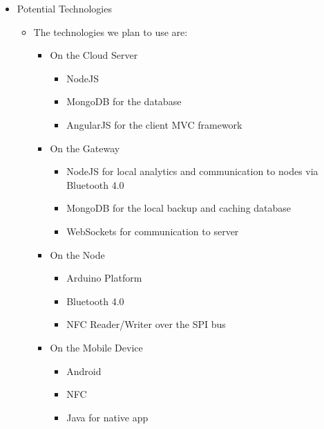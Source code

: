 \begin{itemize}
	\item Potential Technologies
	\begin{itemize}
		\item[] The technologies we plan to use are:
		\begin{itemize}
			\item On the Cloud Server
			\begin{itemize}
				\item NodeJS
				\item MongoDB for the database
				\item AngularJS for the client MVC framework
			\end{itemize}
			\item On the Gateway
			\begin{itemize}
				\item NodeJS for local analytics and communication to nodes via Bluetooth 4.0
				\item MongoDB for the local backup and caching database
				\item WebSockets for communication to server
			\end{itemize}
			\item On the Node
			\begin{itemize}
				\item Arduino Platform
				\item Bluetooth 4.0
				\item NFC Reader/Writer over the SPI bus
			\end{itemize}
			\item On the Mobile Device
			\begin{itemize}
				\item Android
				\item NFC
				\item Java for native app
			\end{itemize}
		\end{itemize}
	\end{itemize}
	

\end{itemize}
